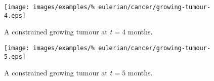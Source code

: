 \begin{figure}[!hptb]
\centering
\texttt{[image: images/examples/\%
eulerian/cancer/growing-tumour-4.eps]}
\caption{A constrained growing tumour at $t=4$ months.}
\label{tumour-growth-constrained-4}
\end{figure}

\begin{figure}[!hptb]
\centering
\texttt{[image: images/examples/\%
eulerian/cancer/growing-tumour-5.eps]}
\caption{A constrained growing tumour at $t=5$ months.}
\label{tumour-growth-constrained-5}
\end{figure}




%


